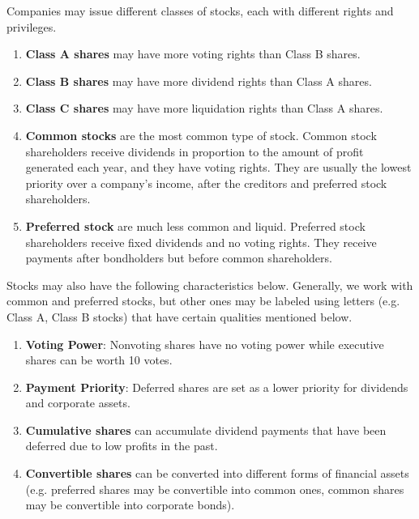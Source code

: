\documentclass{article}
\begin{document}
    \begin{definition}
      Companies may issue different classes of stocks, each with different rights and privileges. 
      \begin{enumerate}
        \item \textbf{Class A shares} may have more voting rights than Class B shares. 
        \item \textbf{Class B shares} may have more dividend rights than Class A shares. 
        \item \textbf{Class C shares} may have more liquidation rights than Class A shares. 
        \item \textbf{Common stocks} are the most common type of stock. Common stock shareholders receive dividends in proportion to the amount of profit generated each year, and they have voting rights. They are usually the lowest priority over a company's income, after the creditors and preferred stock shareholders. 
        \item \textbf{Preferred stock} are much less common and liquid. Preferred stock shareholders receive fixed dividends and no voting rights. They receive payments after bondholders but before common shareholders. 
      \end{enumerate}
    \end{definition}
    
    \begin{definition}
      Stocks may also have the following characteristics below. Generally, we work with common and preferred stocks, but other ones may be labeled using letters (e.g. Class A, Class B stocks) that have certain qualities mentioned below. 
      \begin{enumerate}
        \item \textbf{Voting Power}: Nonvoting shares have no voting power while executive shares can be worth 10 votes. 
        \item \textbf{Payment Priority}: Deferred shares are set as a lower priority for dividends and corporate assets. 
        \item \textbf{Cumulative shares} can accumulate dividend payments that have been deferred due to low profits in the past. 
        \item \textbf{Convertible shares} can be converted into different forms of financial assets (e.g. preferred shares may be convertible into common ones, common shares may be convertible into corporate bonds).
      \end{enumerate}
    \end{definition}
\end{document}

